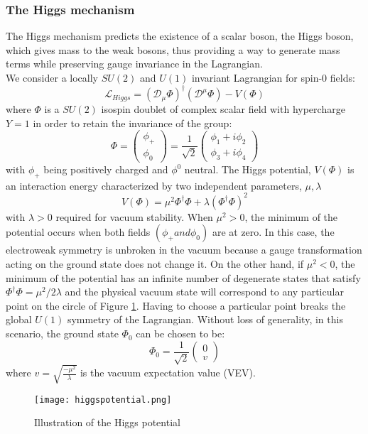 \subsubsection{\label{subsec:intro_Higgs}The Higgs mechanism}%
\noindent The Higgs mechanism predicts the existence of a scalar boson, the Higgs boson, which gives mass to the weak bosons, thus providing a way to generate mass terms while preserving gauge invariance in the Lagrangian.\\
\indent We consider a locally $SU(2)$ and $U(1)$ invariant Lagrangian for spin-0 fields:
\begin{equation}
    \mathscr{L}_{Higgs} = (\mathscr{D}_\mu \Phi)^\dagger (\mathscr{D}^\mu \Phi) - V(\Phi)
\end{equation}
where $\Phi$ is a $SU(2)$ isospin doublet of complex scalar field with hypercharge $Y = 1$ in order to retain the invariance of the group:
\begin{equation}
    \Phi = \begin{pmatrix}
        \phi_+ \\
        \phi_0
    \end{pmatrix} = \frac{1}{\sqrt{2}}\begin{pmatrix}
        \phi_1 + i\phi_2 \\
        \phi_3 + i\phi_4
    \end{pmatrix}
\end{equation}
with $\phi_+$ being positively charged and $\phi^0$ neutral. The Higgs potential, $V(\Phi)$ is an interaction energy characterized by two independent parameters, $\mu,\lambda$
\begin{equation}
    V(\Phi) = \mu^2 \Phi^\dagger\Phi + \lambda(\Phi^\dagger\Phi)^2
\end{equation}
with $\lambda > 0$ required for vacuum stability. When $\mu^2 > 0$, the minimum of the potential occurs when both fields $(\phi_+ and \phi_0)$ are at zero. In this case, the electroweak symmetry is unbroken in the vacuum because a gauge transformation acting on the ground state does not change it. On the other hand, if $\mu^2 < 0$, the minimum of the potential has an infinite number of degenerate states that satisfy $\Phi^\dagger\Phi = \mu^2/2\lambda$ and the physical vacuum state will correspond to any particular point on the circle of Figure \ref{fig:Higgs_potential}. Having to choose a particular point breaks the global $U(1)$ symmetry of the Lagrangian. Without loss of generality, in this scenario, the ground state $\Phi_0$ can be chosen to be:
\begin{equation}
    \Phi_0 = \frac{1}{\sqrt{2}}\begin{pmatrix}
        0 \\
        v
    \end{pmatrix}
\end{equation}
where $v = \sqrt{\frac{-\mu^2}{\lambda}}$ is the vacuum expectation value (VEV).
\begin{figure}[H]
    \centering
    \texttt{[image: higgspotential.png]}
    \caption{Illustration of the Higgs potential \cite{Ellis:1638469}}
    \label{fig:Higgs_potential}
\end{figure}


